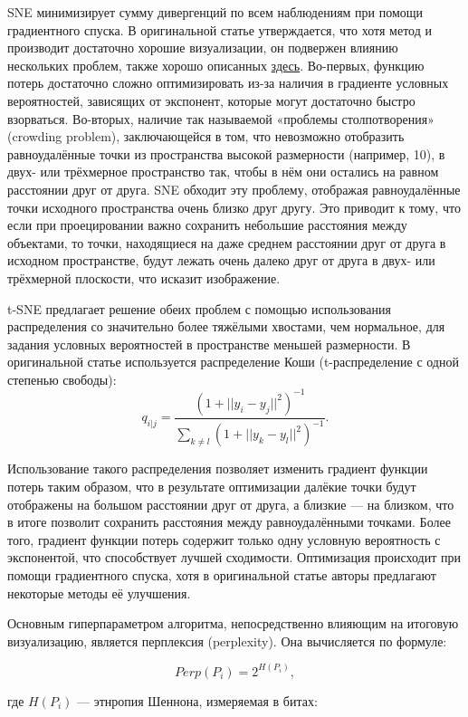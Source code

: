 \documentclass[10pt, a4paper]{extarticle}
\begin{document}
SNE минимизирует сумму дивергенций по всем наблюдениям при помощи градиентного спуска. 
В оригинальной статье утверждается, что хотя метод и производит достаточно хорошие визуализации, он подвержен влиянию нескольких проблем, также хорошо описанных \href{https://medium.com/@layog/i-do-not-understand-t-sne-part-2-b2f997d177e3}{здесь}. 
Во-первых, функцию потерь достаточно сложно оптимизировать из-за наличия в градиенте условных вероятностей, зависящих от экспонент, которые могут достаточно быстро взорваться. 
Во-вторых, наличие так называемой «проблемы столпотворения» (crowding problem), заключающейся в том, что невозможно отобразить равноудалённые точки из пространства высокой размерности (например, 10), в двух- или трёхмерное пространство так, чтобы в нём они остались на равном расстоянии друг от друга. 
SNE обходит эту проблему, отображая равноудалённые точки исходного пространства очень близко друг другу. 
Это приводит к тому, что если при проецировании важно сохранить небольшие расстояния между объектами, то точки, находящиеся на даже среднем расстоянии друг от друга в исходном пространстве, будут лежать очень далеко друг от друга в двух- или трёхмерной плоскости, что исказит изображение. 

t-SNE предлагает решение обеих проблем с помощью использования распределения со значительно более тяжёлыми хвостами, чем нормальное, для задания условных вероятностей в пространстве меньшей размерности. 
В оригинальной статье используется распределение Коши (t-распределение с одной степенью свободы):
\[
q_{i | j} = \dfrac{(1 + ||y_i - y_j||^2)^{-1}}{\sum_{k \ne l}(1 + ||y_k - y_l||^2)^{-1}}.
\]

Использование такого распределения позволяет изменить градиент функции потерь таким образом, что в результате оптимизации далёкие точки будут отображены на большом расстоянии друг от друга, а близкие — на близком, что в итоге позволит сохранить расстояния между равноудалёнными точками.
Более того, градиент функции потерь содержит только одну условную вероятность с экспонентой, что способствует лучшей сходимости. 
Оптимизация происходит при помощи градиентного спуска, хотя в оригинальной статье авторы предлагают некоторые методы её улучшения.

Основным гиперпараметром алгоритма, непосредственно влияющим на итоговую визуализацию, является перплексия (perplexity).
Она вычисляется по формуле:

\[
Perp(P_i) = 2^{H(P_i)}, 
\]

где ${H(P_i)}$ — этнропия Шеннона, измеряемая в битах:
\end{document}
